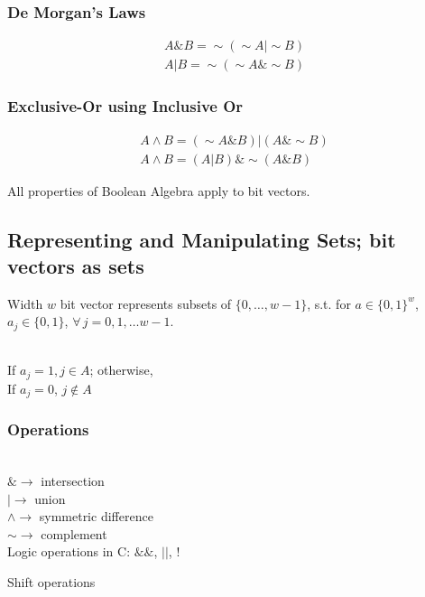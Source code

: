 \documentclass[10pt]{amsart}
\begin{document}
\subsubsection{De Morgan's Laws}

\[
\begin{gathered}
A \& B = \sim (\sim A | \sim B) \\
A | B = \sim (\sim A \& \sim B)
\end{gathered}
\]

\subsubsection{Exclusive-Or using Inclusive Or}

\[
\begin{gathered} 
A \wedge B = (\sim A \& B) | (A \& \sim B) \\
A \wedge B = (A | B) \& \sim (A \& B)
\end{gathered} 
\]

All properties of Boolean Algebra apply to bit vectors.

\subsection{Representing and Manipulating Sets; bit vectors as sets}

Width $w$ bit vector represents subsets of $\lbrace 0 ,\dots, w-1 \rbrace$, s.t. for $a\in \lbrace 0 ,1 \rbrace^w$, $a_j \in \lbrace 0 , 1 \rbrace$, $\forall \, j = 0,1,\dots w -1$. 

\qquad \\
If $a_j = 1, j \in A$; otherwise, \\
If $a_j =0$, $j \notin A$
\qquad \\

\subsubsection{Operations}

\qquad \\
$\& \to $ intersection \\
$| \to $ union \\
$\wedge \to $ symmetric difference \\
$\sim \to $ complement
\qquad \\

Logic operations in C: $\& \&$, $||$, $!$ 

Shift operations
\end{document}
